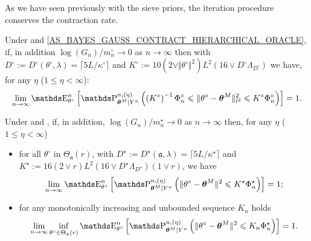 \begin{il}
\ilEnd
\end{il}

As we have seen previously with the sieve priors, the iteration procedure conserves the contraction rate.

\begin{cor}\label{COR_BAYES_GAUSS_CONTRACT_HIERARCHICAL_ORACLE}
Under  and \textsc{\cref{AS_BAYES_GAUSS_CONTRACT_HIERARCHICAL_ORACLE}}, if, in addition $\log(G_{n})/m_{n}^{\circ} \rightarrow 0$ as $n \rightarrow \infty$ then with $D^{\circ} := D^{\circ}(\theta^{\circ}, \lambda) = \lceil 5 L/\kappa^{\circ} \rceil$ and $K^{\circ} := 10(2 \vee \Vert \theta^{\circ} \Vert^{2})L^{2}(16 \vee D^{\circ} \Lambda_{D^{\circ}})$ we have, for any $\eta$ ($1 \leq \eta < \infty$):
\[\lim\limits_{n \rightarrow \infty} \E_{\theta^{\circ}}^{n}\left[\P_{\boldsymbol{\theta}^{M} \vert Y^{n}}^{n, (\eta)} \left(\left(K^{\circ}\right)^{-1} \Phi_{n}^{\circ} \leq \Vert \theta^{\circ} - \boldsymbol{\theta}^{M} \Vert_{l^{2}}^{2} \leq K^{\circ} \Phi_{n}^{\circ}\right)\right] = 1.\]
\end{cor}

\begin{cor}\label{COR_BAYES_GAUSS_CONTRACT_HIERARCHICAL_MINIMAX}
Under  and , if, in addition, $\log(G_{n})/m_{n}^{\star} \rightarrow 0$ as $n \rightarrow \infty$ then, for any $\eta$ ($1 \leq \eta < \infty$)
\begin{itemize}
\item for all $\theta^{\circ}$ in $\Theta_{\mathfrak{a}}(r)$, with $D^{\star} := D^{\star}(\mathfrak{a}, \lambda) = \lceil 5 L/\kappa^{\star} \rceil$ and $K^{\star} := 16\left(2 \vee r\right)L^{2}\left(16 \vee D^{\star} \Lambda_{D^{\star}}\right)\left(1 \vee r \right)$, we have
\[\lim\limits_{n \rightarrow \infty} \E_{\theta^{\circ}}^{n}\left[\P_{\boldsymbol{\theta}^{M} \vert Y^{n}}^{n, (\eta)}\left(\Vert \theta^{\circ} - \boldsymbol{\theta}^{M} \Vert^{2} \leq K^{\star} \Phi_{n}^{\star}\right)\right] =1;\]
\item for any monotonically increasing and unbounded sequence $K_{n}$ holds
\[\lim\limits_{n \rightarrow \infty} \inf\limits_{\theta^{\circ} \in \Theta_{\mathfrak{a}}(r)} \E_{\theta^{\circ}}^{n}\left[\P_{\boldsymbol{\theta}^{M} \vert Y^{n}}^{n, (\eta)}\left(\Vert \theta^{\circ} - \boldsymbol{\theta}^{M} \Vert^{2} \leq K_{n} \Phi_{n}^{\star}\right)\right] =1.\]
\end{itemize}
\end{cor}

